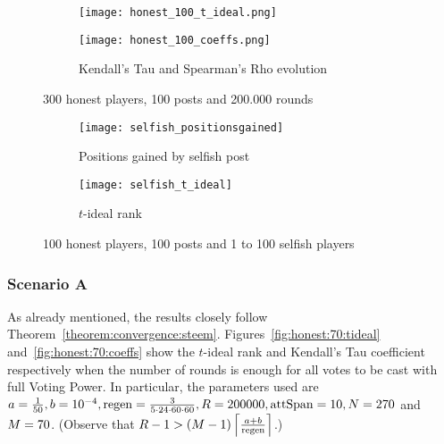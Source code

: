     \begin{figure}[h]
      \begin{subfigure}[t]{0.5\textwidth}
        \centering
        \texttt{[image: honest\_100\_t\_ideal.png]}
        \label{fig:honest:100:tideal}
      \end{subfigure}\hfill
      \begin{subfigure}[t]{0.5\textwidth}
        \centering
        \texttt{[image: honest\_100\_coeffs.png]}
        \caption{Kendall's Tau and Spearman's Rho evolution}
        \label{fig:honest:100:coeffs}
      \end{subfigure}
      \caption{300 honest players, 100 posts and 200.000 rounds}
    \end{figure}

    \begin{figure}[h]
      \begin{subfigure}[t]{0.5\textwidth}
        \centering
        \texttt{[image: selfish\_positionsgained]}
        \caption{Positions gained by selfish post}
        \label{fig:selfish:gain}
      \end{subfigure}\hfill
      \begin{subfigure}[t]{0.5\textwidth}
        \centering
        \texttt{[image: selfish\_t\_ideal]}
        \caption{$t$-ideal rank}
        \label{fig:selfish:tideal}
      \end{subfigure}
      \caption{100 honest players, 100 posts and 1 to 100 selfish players}
    \end{figure}

    \subsubsection{Scenario A}
      As already mentioned, the results closely follow
      Theorem~\ref{theorem:convergence:steem}.
      Figures~\ref{fig:honest:70:tideal} and~\ref{fig:honest:70:coeffs} show the
      $t$-ideal rank and Kendall's Tau coefficient respectively when the number
      of rounds is enough for all votes to be cast with full Voting Power. In
      particular, the parameters used are $a = \frac{1}{50}, b = 10^{-4}, \regen
      = \frac{3}{5 \cdot 24 \cdot 60 \cdot 60}, \rounds = 200000, \attspan = 10,
      \playerlen = 270$ and $\postlen = 70$. (Observe that $\rounds - 1 >
      \left(\postlen - 1\right)\ceil*{\frac{a + b}{\regen}}$.)

